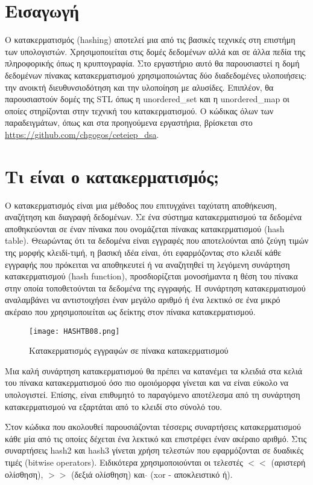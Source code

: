 \section{Εισαγωγή}
Ο κατακερματισμός (hashing) αποτελεί μια από τις βασικές τεχνικές στη επιστήμη των υπολογιστών. Χρησιμοποιείται στις δομές δεδομένων αλλά και σε άλλα πεδία της πληροφορικής όπως η κρυπτογραφία. Στο εργαστήριο αυτό θα παρουσιαστεί η δομή δεδομένων πίνακας κατακερματισμού χρησιμοποιώντας δύο διαδεδομένες υλοποιήσεις: την ανοικτή διευθυνσιοδότηση και την υλοποίηση με αλυσίδες. Επιπλέον, θα παρουσιαστούν δομές της STL όπως η unordered\_set και η unordered\_map οι οποίες στηρίζονται στην τεχνική του κατακερματισμού. Ο κώδικας όλων των παραδειγμάτων, όπως και στα προηγούμενα εργαστήρια, βρίσκεται στο \href{https://github.com/chgogos/ceteiep_dsa}{https://github.com/chgogos/ceteiep\_dsa}.

\section{Τι είναι ο κατακερματισμός;}
Ο κατακερματισμός είναι μια μέθοδος που επιτυγχάνει ταχύτατη αποθήκευση, αναζήτηση και διαγραφή δεδομένων. Σε ένα σύστημα κατακερματισμού τα δεδομένα αποθηκεύονται σε έναν πίνακα που ονομάζεται πίνακας κατακερματισμού (hash table). Θεωρώντας ότι τα δεδομένα είναι εγγραφές που αποτελούνται από ζεύγη τιμών της μορφής κλειδί-τιμή, η βασική ιδέα είναι, ότι εφαρμόζοντας στο κλειδί κάθε εγγραφής που πρόκειται να αποθηκευτεί ή να αναζητηθεί τη λεγόμενη συνάρτηση κατακερματισμού (hash function), προσδιορίζεται μονοσήμαντα η θέση του πίνακα στην οποία τοποθετούνται τα δεδομένα της εγγραφής. Η συνάρτηση κατακερματισμού αναλαμβάνει να αντιστοιχήσει έναν μεγάλο αριθμό ή ένα λεκτικό σε ένα μικρό ακέραιο που χρησιμοποιείται ως δείκτης στον πίνακα κατακερματισμού.

\begin{figure}[ht!]
\centering
\texttt{[image: HASHTB08.png]}
\caption{Κατακερματισμός εγγραφών σε πίνακα κατακερματισμού \cite{wiki_hashtables}}
\label{fig:hashtable1}
\end{figure}

Μια καλή συνάρτηση κατακερματισμού θα πρέπει να κατανέμει τα κλειδιά στα κελιά του πίνακα κατακερματισμού όσο πιο ομοιόμορφα γίνεται και να είναι εύκολο να υπολογιστεί. Επίσης, είναι επιθυμητό το παραγόμενο αποτέλεσμα από τη συνάρτηση κατακερματισμού να εξαρτάται από το κλειδί στο σύνολό του.

Στον κώδικα που ακολουθεί παρουσιάζονται τέσσερις συναρτήσεις κατακερματισμού κάθε μία από τις οποίες δέχεται ένα λεκτικό και επιστρέφει έναν ακέραιο αριθμό. Στις συναρτήσεις hash2 και hash3 γίνεται χρήση τελεστών που εφαρμόζονται σε δυαδικές τιμές (bitwise operators). Ειδικότερα χρησιμοποιούνται οι τελεστές $<<$ (αριστερή ολίσθηση), $>>$ (δεξιά ολίσθηση) και $\hat{}$ (xor - αποκλειστικό ή).

